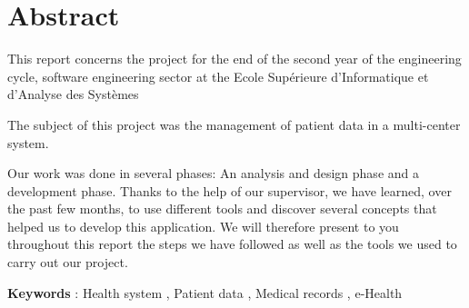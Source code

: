\chapter*{Abstract}


This report concerns the project for the end of the second year of the engineering cycle, software engineering sector at the Ecole Supérieure d'Informatique et d'Analyse des Systèmes

The subject of this project was the management of patient data in a multi-center system.

  Our work was done in several phases:
  An analysis and design phase and a development phase.
  Thanks to the help of our supervisor, we have learned, over the past few months, to use
different tools and discover several concepts that helped us to develop this application.
  We will therefore present to you throughout this report the steps we have
followed as well as the tools we used to carry out our project.

\textbf{Keywords} : Health system , Patient data ,  Medical records , e-Health 